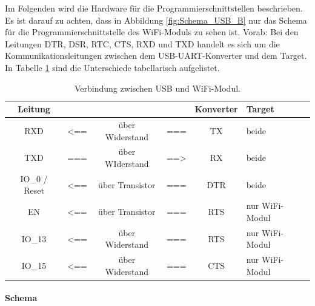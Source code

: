 Im Folgenden wird die Hardware für die Programmierschnittstellen beschrieben. Es ist darauf zu achten, dass in Abbildung \ref{fig:Schema_USB_B} nur das Schema für die Programmierschnittstelle des WiFi-Moduls zu sehen ist. Vorab: Bei den Leitungen DTR, DSR, RTC, CTS, RXD und TXD handelt es sich um die Kommunikationsleitungen zwischen dem USB-UART-Konverter und dem Target. In Tabelle \ref{tab:USB_ESP} sind die Unterschiede tabellarisch aufgelistet.

\begin{table}[H]
\center
\begin{tabular}{|c|lcl|c||l|}
\hline
\textbf{Leitung} & & & & \textbf{Konverter} & \textbf{Target} \\ \hline
RXD & <== & über Widerstand & === & TX & beide \\
TXD & === & über WIderstand & ==> & RX & beide\\
IO\_0 / Reset & <== & über Transistor & === & DTR & beide\\
EN & <== & über Transistor & === & RTS & nur WiFi-Modul\\
IO\_13 & <== & über Widerstand & === & RTS & nur WiFi-Modul\\
IO\_15 & <== & über Widerstand & === & CTS & nur WiFi-Modul\\
\hline
\end{tabular}
\caption{Verbindung zwischen USB und WiFi-Modul.}
\label{tab:USB_ESP}
\end{table}

\paragraph{Schema}\mbox{}

